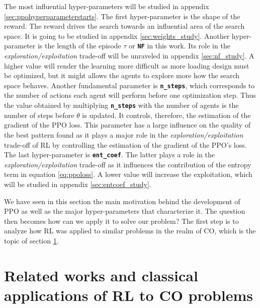 \documentclass[a4paper]{article}
\newcommand{\code}[1]{\colorbox{light-gray}{\small\color{blue}\textbf{\texttt{#1}}}}
\begin{document}
The most influential hyper-parameters will be studied in appendix \ref{sec:ppohyperparameterstarts}. The first hyper-parameter is the shape of the reward. The reward drives the search towards an influential area of the search space. It is going to be studied in appendix \ref{sec:weights_study}. Another hyper-parameter is the length of the episode $\tau$ or \code{NF} in this work. Its role in the \textit{exploration/exploitation} trade-off will be unraveled in appendix \ref{sec:nf_study}. A higher value will render the learning more difficult as more loading design must be optimized, but it might allows the agents to explore more how the search space behaves. Another fundamental parameter is \code{n\_steps}, which corresponds to the number of actions each agent will perform before one optimization step. Thus the value obtained by multiplying \code{n\_steps} with the number of agents is the number of steps before $\theta$ is updated. It controls, therefore, the estimation of the gradient of the PPO loss. This parameter has a large influence on the quality of the best pattern found as it plays a major role in the \textit{exploration/exploitation} trade-off of RL by controlling the estimation of the gradient of the PPO's loss. The last hyper-parameter is \code{ent\_coef}. The latter plays a role in the \textit{exploration/exploitation} trade-off as it influences the contribution of the entropy term in equation \ref{eq:ppoloss}. A lower value will increase the exploitation, which will be studied in appendix \ref{sec:entcoef_study}.

We have seen in this section the main motivation behind the development of PPO as well as the major hyper-parameters that characterize it. The question then becomes how can we apply it to solve our problem? The first step is to analyze how RL was applied to similar problems in the realm of CO, which is the topic of section \ref{sec:relatedwork}.

\section{Related works and classical applications of RL to CO problems}
\label{sec:relatedwork}
\end{document}
